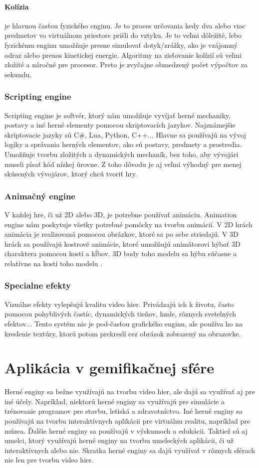 \documentclass[10pt,oneside,slovak,a4paper,hidelinks]{article}
\begin{document}
			\paragraph{Kolízia} je hlavnou časťou fyzického enginu. Je to proces určovania kedy dva alebo viac predmetov vo virtuálnom priestore prišli do vztyku. Je to veľmi dôležité, lebo fyzickému enginu umožňuje presne simulovať dotyk/zrážky, ako je vzájomný odraz alebo prenos kinetickej energie. Algoritmy na zisťovanie kolízií sú veľmi zložité a náročné pre procesor. Preto je zvyčajne obmedzený počet výpočtov za sekundu.
		\subsubsection{Scripting engine}
			Scripting engine je softvér, ktorý nám umožňuje vyvíjať herné mechaniky, postavy a iné herné elementy pomocou skriptovacích jazykov. Najznámejšie skriptovacie jazyky sú C\#, Lua, Python, C++... Hlavne sa používajú na vývoj logiky a správania herných elementov, ako sú postavy, predmety a prostredia. Umožňuje tvorbu zložitých a dynamických mechaník, bez toho, aby vývojári museli písať kód nízkej úrovne. Z toho dôvodu je aj veľmi výhodný pre menej skúsených vývojárov, ktorý chcú tvoriť hry.
		\subsubsection{Animačný engine}
			V každej hre, či už 2D alebo 3D, je potrebne používať animáciu. Animation engine nám poskytuje všetky potrebné pomôcky na tvorbu animácií. V 2D hrách animácia je realizovaná pomocou obrázkov, ktoré sa po sebe striedajú. V 3D hrách sa používajú kostrové animácie, ktoré umožňujú animátorovi hýbať 3D charaktera pomocou kostí a kĺbov. 3D body toho modelu sa hýbu súčasne a relatívne na kosti toho modelu \cite{Secondary}.
		\subsubsection{Specialne efekty}
			Vizuálne efekty vylepšujú kvalitu video hier. Privádzajú ich k životu, často pomocou pohyblivých častíc, dynamických tieňov, hmle, rôznych svetelných efektov... Tento systém nie je pod-časťou grafického enginu, ale používa ho na kreslenie textúry, ktorú potom prekreslí cez obrázok zobrazený na obrazovke.
	\section{Aplikácia v gemifikačnej sfére}
		Herné enginy sa bežne využívajú na tvorbu video hier, ale dajú sa využívať aj pre iné účely. Napríklad, niektorú herné enginy sa využívajú pre simulácie a trénovanie programov pre stavbu, letiská a zdravotníctvo. Iné herné enginy sa používajú na tvorbu interaktívnych aplikácii pre virtuálnu realitu, napríklad pre múzea. Ďalšie herné enginy sa používajú v výskumoch a edukácii. Taktiež sú aj umelci, ktorý využívajú herné enginy na tvorbu umeleckých aplikácii, či už interaktívnych alebo nie. Skratka herné enginy sa dajú využívať v rôznych sférach nie len pre tvorbu video hier.
\end{document}
